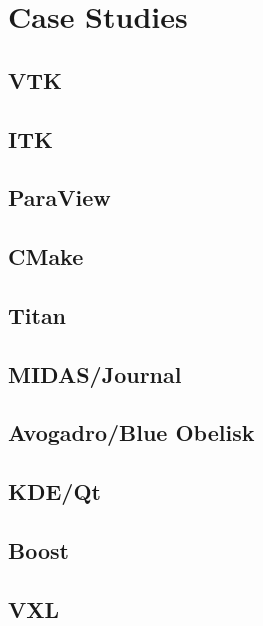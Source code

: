 \chapter{Case Studies}

\section{VTK}

\section{ITK}

\section{ParaView}

\section{CMake}

\section{Titan}

\section{MIDAS/Journal}

\section{Avogadro/Blue Obelisk}

\section{KDE/Qt}

\section{Boost}

\section{VXL}